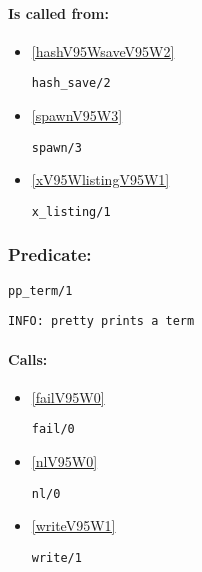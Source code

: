 \paragraph{Is called from:} 
\begin{itemize}
\item \ref{hashV95WsaveV95W2} 
\begin{verbatim}
hash_save/2
\end{verbatim}

\item \ref{spawnV95W3} 
\begin{verbatim}
spawn/3
\end{verbatim}

\item \ref{xV95WlistingV95W1} 
\begin{verbatim}
x_listing/1
\end{verbatim}

\end{itemize}

\subsubsection{Predicate:} \label{ppV95WtermV95W1}

\begin{verbatim}
pp_term/1
\end{verbatim}

{\small \begin{verbatim}
INFO: pretty prints a term

\end{verbatim}}
\paragraph{Calls:} 
\begin{itemize}
\item \ref{failV95W0} 
\begin{verbatim}
fail/0
\end{verbatim}

\item \ref{nlV95W0} 
\begin{verbatim}
nl/0
\end{verbatim}

\item \ref{writeV95W1} 
\begin{verbatim}
write/1
\end{verbatim}

\end{itemize}

